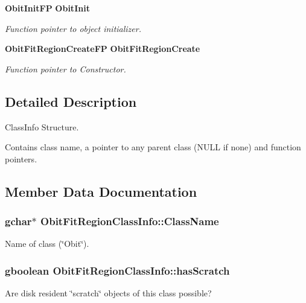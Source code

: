\begin{CompactItemize}
{\bf Obit\-Init\-FP} {\bf Obit\-Init}
\begin{CompactList}\small\item\em Function pointer to object initializer. \item\end{CompactList}\item 
{\bf Obit\-Fit\-Region\-Create\-FP} {\bf Obit\-Fit\-Region\-Create}
\begin{CompactList}\small\item\em Function pointer to Constructor. \item\end{CompactList}\end{CompactItemize}


\subsection{Detailed Description}
Class\-Info Structure. 

Contains class name, a pointer to any parent class (NULL if none) and function pointers. 



\subsection{Member Data Documentation}
\subsubsection{\setlength{\rightskip}{0pt plus 5cm}gchar$\ast$ {\bf Obit\-Fit\-Region\-Class\-Info::Class\-Name}}\label{structObitFitRegionClassInfo_o2}


Name of class (\char`\"{}Obit\char`\"{}). 

\subsubsection{\setlength{\rightskip}{0pt plus 5cm}gboolean {\bf Obit\-Fit\-Region\-Class\-Info::has\-Scratch}}\label{structObitFitRegionClassInfo_o1}


Are disk resident \char`\"{}scratch\char`\"{} objects of this class possible? 


